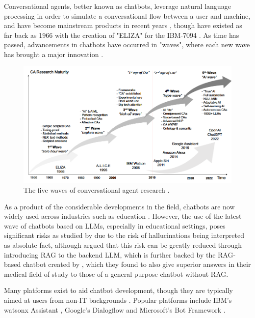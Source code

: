 \documentclass[12pt]{report}
\begin{document}
    Conversational agents, better known as chatbots, leverage natural language processing in order to simulate a conversational flow 
    between a user and machine, and have become mainstream products in recent years \autocite{liao_all_2018},
    though have existed as far back as 1966 with the creation of "ELIZA" for the IBM-7094 \autocite{weizenbaum_elizacomputer_1966}.
    As time has passed, advancements in chatbots have occurred in "waves", where each new wave has brought a major innovation \autocite{schobel_charting_2024}.

    \begin{figure}[H] 
        \centering
        \includegraphics[width=.8\linewidth]{ChatbotWaves.png}
        \caption{The five waves of conversational agent research \autocite{schobel_charting_2024}.}
        \label{fig:ChatbotWaves}
    \end{figure}

    As a product of the considerable developments in the field, chatbots are now widely used 
    across industries such as education \autocite{kuhail_interacting_2023}. However, the use of the latest wave of chatbots based on LLMs,
    especially in educational settings, poses significant risks as studied by \textcite{neumann_llm-driven_2024}
    due to the risk of hallucinations being interpreted as absolute fact, although \textcite{shuster_retrieval_2021} 
    argued that this risk can be greatly reduced through introducing RAG to the backend LLM, which is further backed 
    by the RAG-based chatbot created by \textcite{ge_development_2023}, which they found to also give superior answers
    in their medical field of study to those of a general-purpose chatbot without RAG.  


    Many platforms exist to aid chatbot development, though they are typically aimed at users from non-IT backgrounds 
    \autocite{srivastava_desirable_2020}. Popular platforms include IBM's watsonx Assistant \autocite{ibm_ibm_2024},
    Google's Dialogflow \autocite{google_conversational_nodate} and Microsoft's Bot Framework \autocite{microsoft_microsoft_nodate}.
\end{document}
